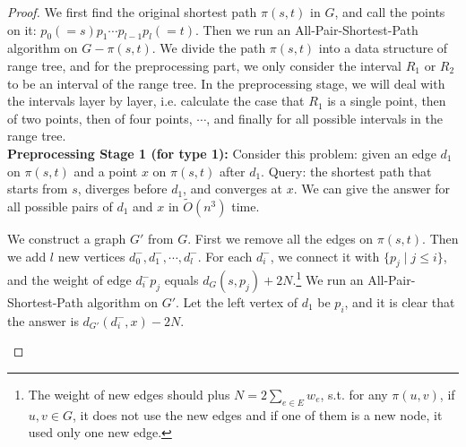 \documentclass[11pt]{article}
\theoremstyle{plain}
\theoremstyle{definition}
\newcommand{\too}[1]{\tilde{O}({#1})}
\begin{document}
\begin{proof}

We first find the original shortest path $\pi(s,t)$ in $G$, and call the points on it: $p_0(=s)p_1\cdots p_{l-1}p_l(=t).$ Then we run an All-Pair-Shortest-Path algorithm on $G-\pi(s,t).$ We divide the path $\pi(s,t)$ into a data structure of range tree, and for the preprocessing part, we only consider the interval $R_1$ or $R_2$ to be an interval of the range tree. In the preprocessing stage, we will deal with the intervals layer by layer, i.e. calculate the case that $R_1$ is a single point, then of two points, then of four points, $\cdots$, and finally for all possible intervals in the range tree.\\

\noindent\textbf{Preprocessing Stage 1 (for type 1):} Consider this problem: given an edge $d_1$ on $\pi(s,t)$ and a point $x$ on $\pi(s,t)$ after $d_1.$ Query: the shortest path that starts from $s$, diverges before $d_1$, and converges at $x.$ We can give the answer for all possible pairs of $d_1$ and $x$ in $\too{n^3}$ time.

We construct a graph $G'$ from $G.$ First we remove all the edges on $\pi(s,t).$ Then we add $l$ new vertices $d^-_0,d^-_1,\cdots,d^-_l.$ For each $d^-_i$, we connect it with $\{p_j\mid j\le i\}$, and the weight of edge $d^-_ip_j$ equals $d_{G}(s,p_j) + 2N.$\footnote{ \red The weight of new edges should plus $N=2\sum_{e\in E}w_e$, s.t. for any $\pi(u,v)$, if $u,v\in G$, it does not use the new edges and if one of them is a new node, it used only one new edge.} We run an All-Pair-Shortest-Path algorithm on $G'$. Let the left vertex of $d_1$ be $p_i$, and it is clear that the answer is $d_{G'}(d^-_i,x) -2N.$

\begin{center}
    


\begin{tikzpicture}[x=0.75pt,y=0.75pt,yscale=-1,xscale=1]



\end{tikzpicture}
\end{center}
\end{proof}
\end{document}
